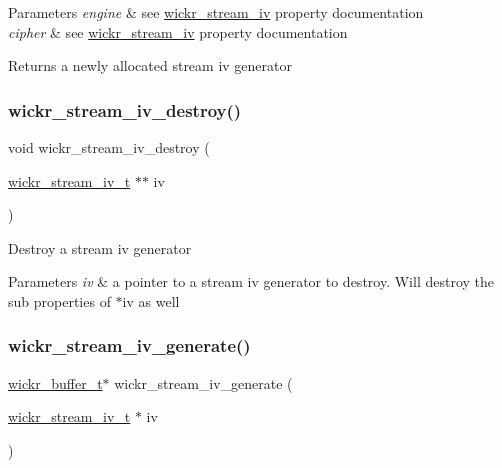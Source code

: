 \begin{DoxyParams}{Parameters}
{\em engine} & see \textquotesingle{}\hyperlink{structwickr__stream__iv}{wickr\+\_\+stream\+\_\+iv}\textquotesingle{} property documentation \\
\hline
{\em cipher} & see \textquotesingle{}\hyperlink{structwickr__stream__iv}{wickr\+\_\+stream\+\_\+iv}\textquotesingle{} property documentation\\
\hline
\end{DoxyParams}
\begin{DoxyReturn}{Returns}
a newly allocated stream iv generator 
\end{DoxyReturn}
\mbox{\label{group__wickr__stream__iv_gad6ac87d891822a866a0d7cad48f79e27}} 
\subsubsection{\texorpdfstring{wickr\+\_\+stream\+\_\+iv\+\_\+destroy()}{wickr\_stream\_iv\_destroy()}}
{\footnotesize\ttfamily void wickr\+\_\+stream\+\_\+iv\+\_\+destroy (\begin{DoxyParamCaption}\item[{\hyperlink{structwickr__stream__iv}{wickr\+\_\+stream\+\_\+iv\+\_\+t} $\ast$$\ast$}]{iv }\end{DoxyParamCaption})}

Destroy a stream iv generator


\begin{DoxyParams}{Parameters}
{\em iv} & a pointer to a stream iv generator to destroy. Will destroy the sub properties of \textquotesingle{}$\ast$iv\textquotesingle{} as well \\
\hline
\end{DoxyParams}
\mbox{\label{group__wickr__stream__iv_gaddcfdc9904ec0ffd32ce8f988aefc484}} 
\subsubsection{\texorpdfstring{wickr\+\_\+stream\+\_\+iv\+\_\+generate()}{wickr\_stream\_iv\_generate()}}
{\footnotesize\ttfamily \hyperlink{structwickr__buffer}{wickr\+\_\+buffer\+\_\+t}$\ast$ wickr\+\_\+stream\+\_\+iv\+\_\+generate (\begin{DoxyParamCaption}\item[{\hyperlink{structwickr__stream__iv}{wickr\+\_\+stream\+\_\+iv\+\_\+t} $\ast$}]{iv }\end{DoxyParamCaption})}

